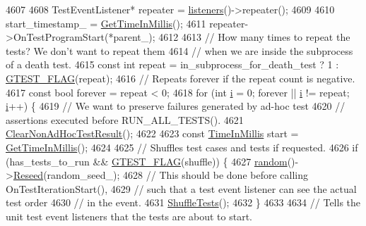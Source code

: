 \begin{DoxyCode}
{4607 
4608   TestEventListener* repeater = \hyperlink{classtesting_1_1internal_1_1UnitTestImpl_a67211f8475936f88d0e4d30f841c0da4}{listeners}()->repeater();
4609 
4610   start\_timestamp\_ = \hyperlink{namespacetesting_1_1internal_ae66b46943a429e6efb1db456d4cae90c}{GetTimeInMillis}();
4611   repeater->OnTestProgramStart(*parent\_);
4612 
4613   \textcolor{comment}{// How many times to repeat the tests?  We don't want to repeat them}
4614   \textcolor{comment}{// when we are inside the subprocess of a death test.}
4615   \textcolor{keyword}{const} \textcolor{keywordtype}{int} repeat = in\_subprocess\_for\_death\_test ? 1 : \hyperlink{gtest-port_8h_a828f4e34a1c4b510da50ec1563e3562a}{GTEST\_FLAG}(repeat);
4616   \textcolor{comment}{// Repeats forever if the repeat count is negative.}
4617   \textcolor{keyword}{const} \textcolor{keywordtype}{bool} forever = repeat < 0;
4618   \textcolor{keywordflow}{for} (\textcolor{keywordtype}{int} \hyperlink{gtest__output__test__golden__lin_8txt_a7e98b8a17c0aad30ba64d47b74e2a6c1}{i} = 0; forever || \hyperlink{gtest__output__test__golden__lin_8txt_a7e98b8a17c0aad30ba64d47b74e2a6c1}{i} != repeat; \hyperlink{gtest__output__test__golden__lin_8txt_a7e98b8a17c0aad30ba64d47b74e2a6c1}{i}++) \{
4619     \textcolor{comment}{// We want to preserve failures generated by ad-hoc test}
4620     \textcolor{comment}{// assertions executed before RUN\_ALL\_TESTS().}
4621     \hyperlink{classtesting_1_1internal_1_1UnitTestImpl_a96c2a5b23541ef01020c402644563ba1}{ClearNonAdHocTestResult}();
4622 
4623     \textcolor{keyword}{const} \hyperlink{namespacetesting_1_1internal_a66a845df404b38fe85c5e14a069f255a}{TimeInMillis} start = \hyperlink{namespacetesting_1_1internal_ae66b46943a429e6efb1db456d4cae90c}{GetTimeInMillis}();
4624 
4625     \textcolor{comment}{// Shuffles test cases and tests if requested.}
4626     \textcolor{keywordflow}{if} (has\_tests\_to\_run && \hyperlink{gtest-port_8h_a828f4e34a1c4b510da50ec1563e3562a}{GTEST\_FLAG}(shuffle)) \{
4627       \hyperlink{classtesting_1_1internal_1_1UnitTestImpl_ab3b45b5eb4d583219a3602011ea44347}{random}()->\hyperlink{classtesting_1_1internal_1_1Random_adf2f24199318a46f885c78f50d89a69e}{Reseed}(random\_seed\_);
4628       \textcolor{comment}{// This should be done before calling OnTestIterationStart(),}
4629       \textcolor{comment}{// such that a test event listener can see the actual test order}
4630       \textcolor{comment}{// in the event.}
4631       \hyperlink{classtesting_1_1internal_1_1UnitTestImpl_aaaa38e6a4372e6bb9bbe3143a3a32b65}{ShuffleTests}();
4632     \}
4633 
4634     \textcolor{comment}{// Tells the unit test event listeners that the tests are about to start.}
}
\end{DoxyCode}

